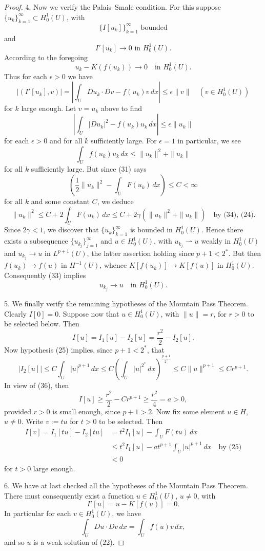 \begin{proof}
4. Now we verify the Palais--Smale condition. For this suppose $\{u_k\}_{k=1}^\infty \subset H_0^1(U)$, with
\[
\{I[u_k]\}_{k=1}^\infty \text{ bounded}
\tag{31}
\]
and
\[
I'[u_k] \to 0 \text{ in } H_0^1(U).
\tag{32}
\]
According to the foregoing
\[
u_k - K(f(u_k)) \to 0 \quad \text{in } H_0^1(U).
\tag{33}
\]
Thus for each $\epsilon > 0$ we have
\[
\left|(I'[u_k], v)\right| = \left|\int_U Du_k \cdot Dv - f(u_k)v\, dx\right| \leq \epsilon\|v\| \quad (v \in H_0^1(U))
\]
for $k$ large enough. Let $v = u_k$ above to find
\[
\left|\int_U |Du_k|^2 - f(u_k)u_k\, dx\right| \leq \epsilon\|u_k\|
\]
for each $\epsilon > 0$ and for all $k$ sufficiently large. For $\epsilon = 1$ in particular, we see
\[
\int_U f(u_k)u_k\, dx \leq \|u_k\|^2 + \|u_k\|
\tag{34}
\]
for all $k$ sufficiently large. But since (31) says
\[
\left(\frac{1}{2}\|u_k\|^2 - \int_U F(u_k)\, dx\right) \leq C < \infty
\]
for all $k$ and some constant $C$, we deduce
\[
\|u_k\|^2 \leq C + 2\int_U F(u_k)\, dx \leq C + 2\gamma\left(\|u_k\|^2 + \|u_k\|\right) \quad \text{by (34), (24).}
\]
Since $2\gamma < 1$, we discover that $\{u_k\}_{k=1}^\infty$ is bounded in $H_0^1(U)$. Hence there exists a subsequence $\{u_{k_j}\}_{j=1}^\infty$ and $u \in H_0^1(U)$, with $u_{k_j} \rightharpoonup u$ weakly in $H_0^1(U)$ and $u_{k_j} \to u$ in $L^{p+1}(U)$, the latter assertion holding since $p+1 < 2^*$. But then $f(u_k) \to f(u)$ in $H^{-1}(U)$, whence $K[f(u_k)] \to K[f(u)]$ in $H_0^1(U)$. Consequently (33) implies
\[
u_{k_j} \to u \quad \text{in } H_0^1(U).
\tag{35}
\]

5. We finally verify the remaining hypotheses of the Mountain Pass Theorem. Clearly $I[0] = 0$. Suppose now that $u \in H_0^1(U)$, with $\|u\| = r$, for $r > 0$ to be selected below. Then
\[
I[u] = I_1[u] - I_2[u] = \frac{r^2}{2} - I_2[u].
\tag{36}
\]
Now hypothesis (25) implies, since $p + 1 < 2^*$, that
\[
|I_2[u]| \leq C \int_U |u|^{p+1}\, dx \leq C \left(\int_U |u|^{2^*}\, dx\right)^{\frac{p+1}{2^*}} \leq C\|u\|^{p+1} \leq Cr^{p+1}.
\]
In view of (36), then
\[
I[u] \geq \frac{r^2}{2} - Cr^{p+1} \geq \frac{r^2}{4} = a > 0,
\]
provided $r > 0$ is small enough, since $p + 1 > 2$. Now fix some element $u \in H$, $u \neq 0$. Write $v := tu$ for $t > 0$ to be selected. Then
\[
\begin{aligned}
I[v] = I_1[tu] - I_2[tu] &= t^2 I_1[u] - \int_U F(tu)\, dx \\
&\leq t^2 I_1[u] - at^{p+1} \int_U |u|^{p+1}\, dx \quad \text{by (25)} \\
&< 0
\end{aligned}
\]
for $t > 0$ large enough.

6. We have at last checked all the hypotheses of the Mountain Pass Theorem. There must consequently exist a function $u \in H_0^1(U)$, $u \neq 0$, with
\[
I'[u] = u - K[f(u)] = 0.
\]
In particular for each $v \in H_0^1(U)$, we have
\[
\int_U Du \cdot Dv\, dx = \int_U f(u)v\, dx,
\]
and so $u$ is a weak solution of (22).
\end{proof}

